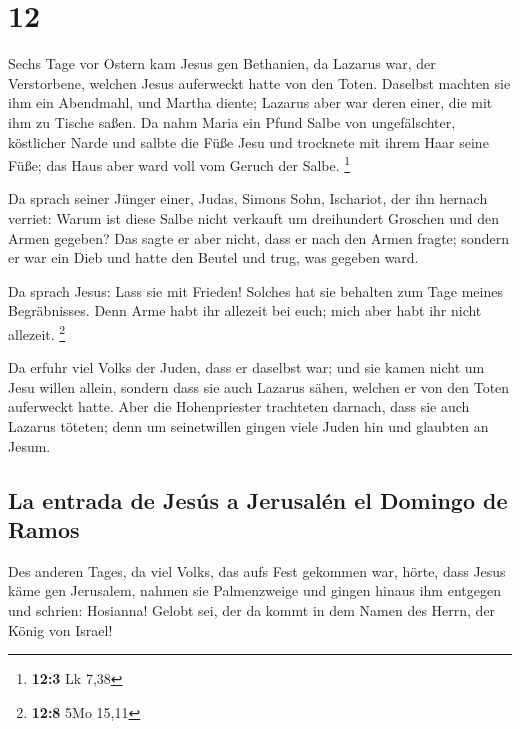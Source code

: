 \hypertarget{section-11}{%
\section{12}\label{section-11}}

 Sechs Tage vor Ostern kam Jesus gen Bethanien, da Lazarus
war, der Verstorbene, welchen Jesus auferweckt hatte von den Toten.
 Daselbst machten sie ihm ein Abendmahl, und Martha
diente; Lazarus aber war deren einer, die mit ihm zu Tische saßen.
 Da nahm Maria ein Pfund Salbe von ungefälschter,
köstlicher Narde und salbte die Füße Jesu und trocknete mit ihrem Haar
seine Füße; das Haus aber ward voll vom Geruch der Salbe. \footnote{\textbf{12:3}
  Lk 7,38}

 Da sprach seiner Jünger einer, Judas, Simons Sohn,
Ischariot, der ihn hernach verriet:  Warum ist diese Salbe
nicht verkauft um dreihundert Groschen und den Armen gegeben?
 Das sagte er aber nicht, dass er nach den Armen fragte;
sondern er war ein Dieb und hatte den Beutel und trug, was gegeben ward.

 Da sprach Jesus: Lass sie mit Frieden! Solches hat sie
behalten zum Tage meines Begräbnisses.  Denn Arme habt ihr
allezeit bei euch; mich aber habt ihr nicht allezeit. \footnote{\textbf{12:8}
  5Mo 15,11}

 Da erfuhr viel Volks der Juden, dass er daselbst war; und
sie kamen nicht um Jesu willen allein, sondern dass sie auch Lazarus
sähen, welchen er von den Toten auferweckt hatte.  Aber
die Hohenpriester trachteten darnach, dass sie auch Lazarus töteten;
 denn um seinetwillen gingen viele Juden hin und glaubten
an Jesum.

\hypertarget{la-entrada-de-jesuxfas-a-jerusaluxe9n-el-domingo-de-ramos}{%
\subsection{La entrada de Jesús a Jerusalén el Domingo de
Ramos}\label{la-entrada-de-jesuxfas-a-jerusaluxe9n-el-domingo-de-ramos}}

 Des anderen Tages, da viel Volks, das aufs Fest gekommen
war, hörte, dass Jesus käme gen Jerusalem,  nahmen sie
Palmenzweige und gingen hinaus ihm entgegen und schrien: Hosianna!
Gelobt sei, der da kommt in dem Namen des Herrn, der König von Israel!

